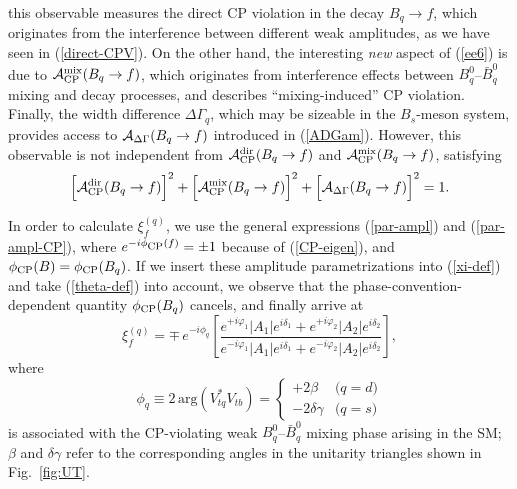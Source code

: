 \documentclass[11pt]{cernrep}
\begin{document}
this observable measures the direct CP violation in the decay
$B_q\to f$, which originates from the interference between different
weak amplitudes, as we have seen in (\ref{direct-CPV}). On the other
hand, the interesting {\it new} aspect of (\ref{ee6}) is due to 
${\cal A}^{\mbox{{\scriptsize mix}}}_{\mbox{{\scriptsize
CP}}}(B_q\to f)$, which originates from interference effects between 
$B_q^0$--$\bar B_q^0$ mixing and decay processes, and describes
``mixing-induced'' CP violation. Finally, the width difference 
$\Delta\Gamma_q$, which may be sizeable in the $B_s$-meson system, 
provides access to ${\cal A}_{\Delta\Gamma}(B_q\to f)$  introduced 
in (\ref{ADGam}). However, this observable is not independent from 
${\cal A}^{\mbox{{\scriptsize dir}}}_{\mbox{{\scriptsize CP}}}(B_q\to f)$ and 
${\cal A}^{\mbox{{\scriptsize mix}}}_{\mbox{{\scriptsize CP}}}(B_q\to f)$,
satisfying 
\begin{equation}\label{Obs-rel}
\Bigl[{\cal A}_{\rm CP}^{\rm dir}(B_q\to f)\Bigr]^2+
\Bigl[{\cal A}_{\rm CP}^{\rm mix}(B_q\to f)\Bigr]^2+
\Bigl[{\cal A}_{\Delta\Gamma}(B_q\to f)\Bigr]^2=1.
\end{equation}

In order to calculate $\xi_f^{(q)}$, we use the general expressions
(\ref{par-ampl}) and (\ref{par-ampl-CP}), where 
$e^{-i\phi_{\mbox{{\scriptsize CP}}}(f)}=\pm1$ because of (\ref{CP-eigen}), and 
$\phi_{\mbox{{\scriptsize CP}}}(B)=\phi_{\mbox{{\scriptsize CP}}}(B_q)$. If we insert
these amplitude parametrizations into (\ref{xi-def}) and take (\ref{theta-def}) into 
account, we observe that the phase-convention-dependent 
quantity $\phi_{\mbox{{\scriptsize CP}}}(B_q)$ cancels, and finally 
arrive at
\begin{equation}\label{xi-re}
\xi_f^{(q)}=\mp\, e^{-i\phi_q}\left[
\frac{e^{+i\varphi_1}|A_1|e^{i\delta_1}+
e^{+i\varphi_2}|A_2|e^{i\delta_2}}{
e^{-i\varphi_1}|A_1|e^{i\delta_1}+
e^{-i\varphi_2}|A_2|e^{i\delta_2}}\right],
\end{equation}
where
\begin{equation}\label{phiq-def}
\phi_q\equiv 2\,\mbox{arg} (V_{tq}^\ast V_{tb})=\left\{\begin{array}{cl}
+2\beta&\mbox{($q=d$)}\\
-2\delta\gamma&\mbox{($q=s$)}\end{array}\right.
\end{equation}
is associated with the CP-violating weak $B_q^0$--$\bar B_q^0$ mixing
phase arising in the SM; $\beta$ and $\delta\gamma$ refer to the corresponding
angles in the unitarity triangles shown in Fig.\ \ref{fig:UT}.
\end{document}
